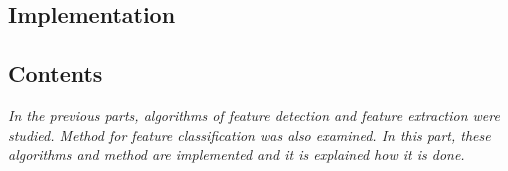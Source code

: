   \begin{titlepage}
    \vspace*{\fill}
      \part{Implementation}
    \vspace*{\fill}
  \end{titlepage}

\startcontents[parts]

\chapter*{Contents}

\textit{In the previous parts, algorithms of feature detection and feature extraction were studied. Method for feature classification was also examined. In this part, these algorithms and method are implemented and it is explained how it is done.} 

\vspace{\baselineskip}


\pagebreak

\clearpage
\newpage

\clearpage
\newpage

\clearpage
\newpage


\stopcontents[parts]
